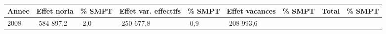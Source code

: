 \begin{longtable}[]{@{}lllllllll@{}}
\toprule
\begin{minipage}[b]{0.05\columnwidth}\raggedright
Annee\strut
\end{minipage} & \begin{minipage}[b]{0.10\columnwidth}\raggedright
Effet noria\strut
\end{minipage} & \begin{minipage}[b]{0.06\columnwidth}\raggedright
\% SMPT\strut
\end{minipage} & \begin{minipage}[b]{0.16\columnwidth}\raggedright
Effet var. effectifs\strut
\end{minipage} & \begin{minipage}[b]{0.06\columnwidth}\raggedright
\% SMPT\strut
\end{minipage} & \begin{minipage}[b]{0.12\columnwidth}\raggedright
Effet vacances\strut
\end{minipage} & \begin{minipage}[b]{0.06\columnwidth}\raggedright
\% SMPT\strut
\end{minipage} & \begin{minipage}[b]{0.10\columnwidth}\raggedright
Total\strut
\end{minipage} & \begin{minipage}[b]{0.06\columnwidth}\raggedright
\% SMPT\strut
\end{minipage}\tabularnewline
\midrule
\endhead
\begin{minipage}[t]{0.05\columnwidth}\raggedright
2008\strut
\end{minipage} & \begin{minipage}[t]{0.10\columnwidth}\raggedright
-584 897,2\strut
\end{minipage} & \begin{minipage}[t]{0.06\columnwidth}\raggedright
-2,0\strut
\end{minipage} & \begin{minipage}[t]{0.16\columnwidth}\raggedright
-250 677,8\strut
\end{minipage} & \begin{minipage}[t]{0.06\columnwidth}\raggedright
-0,9\strut
\end{minipage} & \begin{minipage}[t]{0.12\columnwidth}\raggedright
-208 993,6\strut
\end{minipage} & \begin{minipage}[t]{0.06\columnwidth}\raggedright

\end{minipage}
\end{longtable}
